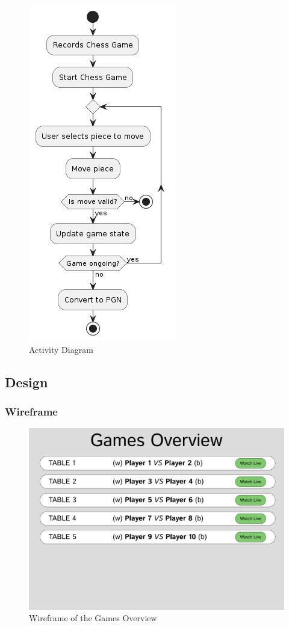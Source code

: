 \begin{figure}[h!]
    \centering
    \includegraphics[height=0.75\linewidth]{figures/uml/activity.png}
    \caption{Activity Diagram}
    \label{fig:activity}
\end{figure}

\subsection{Design}

\subsubsection*{Wireframe}

\begin{figure}[h!]
    \centering
    \includegraphics[width=0.75\linewidth]{figures/wireframe/overview.png}
    \caption{Wireframe of the Games Overview}
    \label{fig:app-overview}
\end{figure}


